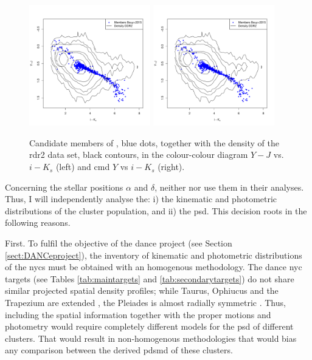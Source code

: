 \begin{figure}[htp!]
\begin{center}
\includegraphics[page=1,width=0.47\textwidth]{background/Figures/Y-J.pdf}
\includegraphics[page=2,width=0.47\textwidth]{background/Figures/Y-J.pdf}
\caption{Candidate members of \citet{Bouy2015}, blue dots, together with the density of the \gls{rdr2} data set, black contours, in the colour-colour  diagram $Y-J$ vs. $i-K_s$ (left) and \gls{cmd} $Y$ vs $i-K_s$ (right).}
\label{fig:Y-JvsY}
\end{center}
\end{figure}
 

 
Concerning the stellar positions $\alpha$ and $\delta$, neither \citet{Bouy2015} nor \citet{Sarro2014} use them in their analyses. Thus, I will independently analyse the: i) the kinematic and photometric distributions of the cluster population, and ii) the \gls{psd}. This decision roots in the following reasons.

First. To fulfil the objective of the \gls{dance} project (see Section \ref{sect:DANCeproject}), the inventory of kinematic and photometric distributions of the \glspl{nyc} must be obtained with an homogenous methodology. The \gls{dance} \gls{nyc} targets (see Tables \ref{tab:maintargets} and \ref{tab:secondarytargets}) do not share similar projected spatial density profiles; while Taurus, Ophiucus and the Trapezium are extended \cite[see for example][]{simon1997}, the Pleiades is almost radially symmetric \citep{Raboud1998}. Thus, including the spatial information together with the proper motions and photometry would require completely different models for the \gls{psd} of different clusters. That would result in non-homogenous methodologies that would bias any comparison between the derived \gls{pdsmd} of these clusters.

